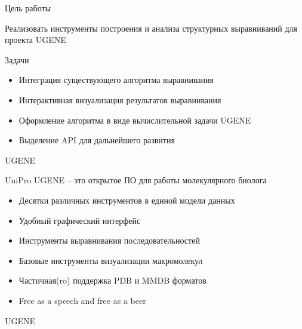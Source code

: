 \documentclass[utf8]{beamer}
\begin{document}
\begin{frame}{Цель работы}
\begin{center}
\Large Реализовать инструменты построения и анализа структурных выравниваний для проекта UGENE
\end{center}
\vspace{11pt}
Задачи
\begin{itemize}
	\item Интеграция существующего алгоритма выравнивания
	\item Интерактивная визуализация результатов выравнивания
	\item Оформление алгоритма в виде вычислительной задачи UGENE
	\item Выделение API для дальнейшего развития
\end{itemize}
\end{frame}

\begin{frame}{UGENE}
\begin{center}
\Large UniPro UGENE -- это открытое ПО для работы молекулярного биолога 
\end{center}
\begin{itemize}
	\item Десятки различных инструментов в единой модели данных
	\item Удобный графический интерфейс
	\item Инструменты выравнивания последовательностей
	\item Базовые инструменты визуализации макромолекул
	\item Частичная(ro) поддержка PDB и MMDB форматов
	\item Free as a speech and free as a beer
\end{itemize}
\end{frame}

\begin{frame}{UGENE}
\begin{figure}[h]
\end{figure}
\end{frame}
\end{document}
